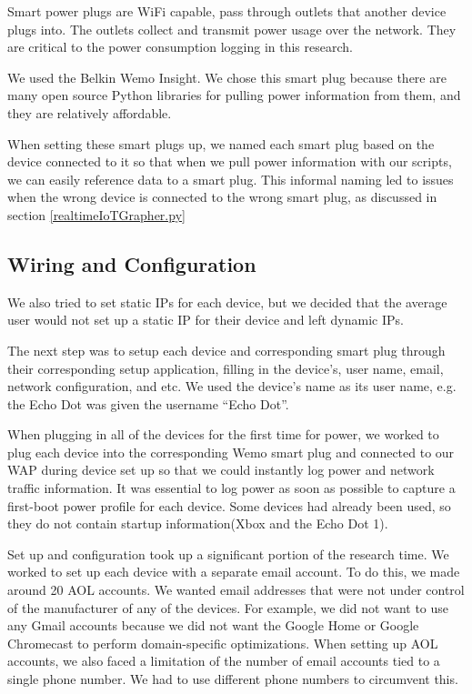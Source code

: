 Smart power plugs are WiFi capable, pass through outlets that another device plugs into. The outlets collect and transmit power usage over the network. They are critical to the power consumption logging in this research.

We used the Belkin Wemo Insight. We chose this smart plug because there are many open source Python libraries for pulling power information from them, and they are relatively affordable.

When setting these smart plugs up, we named each smart plug based on the device connected to it so that when we pull power information with our scripts, we can easily reference data to a smart plug. This informal naming led to issues when the wrong device is connected to the wrong smart plug, as discussed in section \ref{realtimeIoTGrapher.py}

\subsection{Wiring and Configuration}

We also tried to set static IPs for each device, but we decided that the average user would not set up a static IP for their device and left dynamic IPs.

The next step was to setup each device and corresponding smart plug through their corresponding setup application, filling in the device's, user name, email, network configuration, and etc. We used the device's name as its user name, e.g. the Echo Dot was given the username ``Echo Dot''.

When plugging in all of the devices for the first time for power, we worked to plug each device into the corresponding Wemo smart plug and connected to our WAP during device set up so that we could instantly log power and network traffic information. It was essential to log power as soon as possible to capture a first-boot power profile for each device. Some devices had already been used, so they do not contain startup information(Xbox and the Echo Dot 1).

Set up and configuration took up a significant portion of the research time. We worked to set up each device with a separate email account. To do this, we made around 20 AOL accounts. We wanted email addresses that were not under control of the manufacturer of any of the devices. For example, we did not want to use any Gmail accounts because we did not want the Google Home or Google Chromecast to perform domain-specific optimizations. When setting up AOL accounts, we also faced a limitation of the number of email accounts tied to a single phone number. We had to use different phone numbers to circumvent this.

